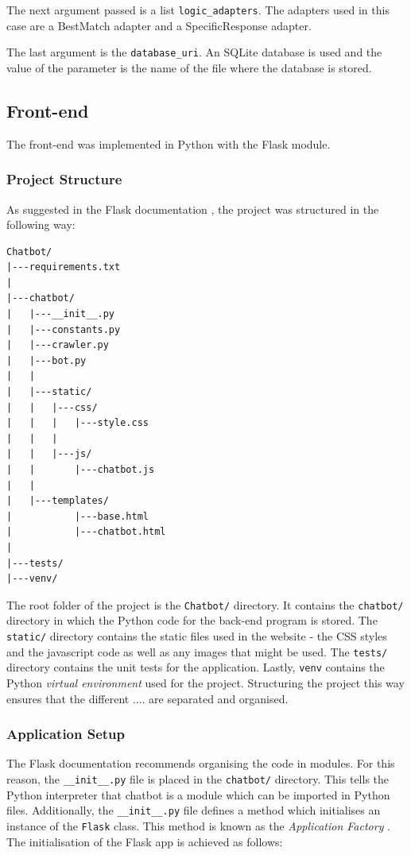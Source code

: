 \documentclass[12pt,a4paper]{article}
\begin{document}
The next argument passed is a list \texttt{logic\_adapters}. The adapters used in this case are a BestMatch adapter and a SpecificResponse adapter.

The last argument is the \texttt{database\_uri}. An SQLite database is used and the value of the parameter is the name of the file where the database is stored.


\subsection{Front-end}
The front-end was implemented in Python with the Flask module.

\subsubsection{Project Structure}
As suggested in the Flask documentation \cite{Flask:online}, the project was structured in the following way: 
\begin{Verbatim}[frame=single]
Chatbot/
|---requirements.txt
|   
|---chatbot/
|   |---__init__.py
|   |---constants.py
|   |---crawler.py
|   |---bot.py
|   |   
|   |---static/
|   |   |---css/
|   |   |   |---style.css
|   |   |       
|   |   |---js/
|   |       |---chatbot.js
|   |           
|   |---templates/
|           |---base.html
|           |---chatbot.html
|           
|---tests/
|---venv/    
\end{Verbatim}

The root folder of the project is the \texttt{Chatbot/} directory. It contains the \texttt{chatbot/} directory in which the Python code for the back-end program is stored. The \texttt{static/} directory contains the static files used in the website - the CSS styles and the javascript code as well as any images that might be used. The \texttt{tests/} directory contains the unit tests for the application. Lastly, \texttt{venv} contains the Python \textit{virtual environment} used for the project. Structuring the project this way ensures that the different .... are separated and organised.

\subsubsection{Application Setup}
The Flask documentation recommends organising the code in modules. For this reason, the \texttt{\_\_init\_\_.py} file is placed in the \texttt{chatbot/} directory. This tells the Python interpreter that chatbot is a module which can be imported in Python files. Additionally, the \texttt{\_\_init\_\_.py} file defines a method which initialises an instance of the \texttt{Flask} class. This method is known as the \textit{Application Factory} \cite{Flask:online}. The initialisation of the Flask app is achieved as follows:
\end{document}
